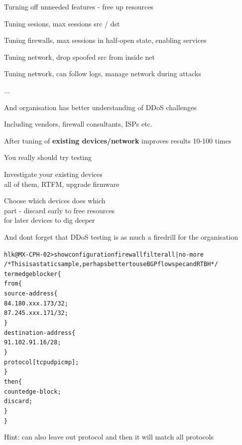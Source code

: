 \documentclass[Screen16to9,17pt]{foils}
\begin{document}

\begin{list1}
\item Turning off unneeded features - free up resources
\item Tuning sesions, max sessions src / dst
\item Tuning firewalls, max sessions in half-open state, enabling services
\item Tuning network, drop spoofed src from inside net \smiley
\item Tuning network, can follow logs, manage network during attacks
\item ...
\item And organisation has better understanding of DDoS challenges
\item Including vendors, firewall consultants, ISPs etc.
\end{list1}

\vskip 1cm
\centerline{After tuning of {\bf existing devices/network} improves results 10-100 times}


\begin{list1}
\item You really should try testing
\item Investigate your existing devices\\
all of them, RTFM, upgrade firmware
\item Choose which devices does which\\
part - discard early to free resources\\
for later devices to dig deeper
\end{list1}

\vskip 2cm
\centerline{And dont forget that DDoS testing is as much a firedrill for the organisation}



\begin{alltt}\footnotesize
hlk@MX-CPH-02> show configuration firewall filter all | no-more
/* This is a static sample, perhaps better to use BGP flowspec and RTBH */
term edgeblocker \{
    from \{
        source-address \{
            84.180.xxx.173/32;
            87.245.xxx.171/32;
        \}
        destination-address \{
            91.102.91.16/28;
        \}
        protocol [ tcp udp icmp ];
    \}
    then \{
        count edge-block;
        discard;
    \}
\}
\end{alltt}
Hint: can also leave out protocol and then it will match all protocols
\end{document}
